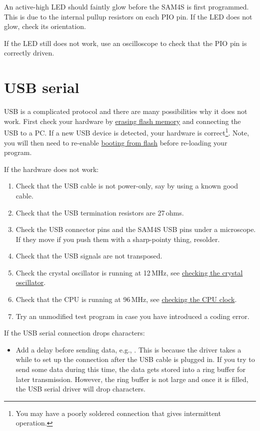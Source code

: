 An active-high LED should faintly glow before the SAM4S is first
programmed.  This is due to the internal pullup resistors on each PIO
pin.  If the LED does not glow, check its orientation.

If the LED still does not work, use an oscilloscope to check that the
PIO pin is correctly driven.


\section{USB serial}
\label{debugging-usb}

USB is a complicated protocol and there are many possibilities why it
does not work.  First check your hardware by
\hyperref[erasing-flash-memory]{erasing flash memory} and connecting
the USB to a PC.  If a new USB device is detected, your hardware is
correct\footnote{You may have a poorly soldered connection that gives
  intermittent operation.}.  Note, you will then need to re-enable
\hyperref[booting-from-flash-memory]{booting from flash} before
re-loading your program.

If the hardware does not work:
%
\begin{enumerate}
  \item Check that the USB cable is not power-only, say by using a
    known good cable.

  \item
    Check that the USB termination resistors are 27\,ohms.

  \item Check the USB connector pins and the SAM4S USB pins under a
    microscope.  If they move if you push them with a sharp-pointy
    thing, resolder.

  \item
    Check that the USB signals are not transposed.

  \item Check the crystal oscillator is running at 12\,MHz, see
    \protect\hyperref[checking-the-crystal-oscillator]{checking the
      crystal oscillator}.

  \item Check that the CPU is running at 96\,MHz, see
    \protect\hyperref[checking-the-clock]{checking the CPU clock}.

  \item Try an unmodified test program in case you have introduced a
    coding error.
\end{enumerate}

If the USB serial connection drops characters:
 \begin{itemize}
 \item Add a delay before sending data, e.g., .
   This is because the driver takes a while to set up the connection
   after the USB cable is plugged in.  If you try to send some data
   during this time, the data gets stored into a ring buffer for later
   transmission.  However, the ring buffer is not large and once it is
   filled, the USB serial driver will drop characters.
 \end{itemize}


